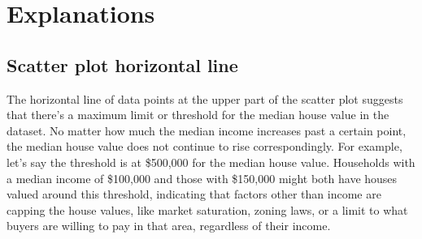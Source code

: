 \documentclass[12pt]{article}
\begin{document}
\section{Explanations}
\subsection{Scatter plot horizontal line}
The horizontal line of data points at the upper part of the scatter plot suggests that there's a maximum limit or threshold for the median house value in the dataset. No matter how much the median income increases past a certain point, the median house value does not continue to rise correspondingly.
For example, let’s say the threshold is at \$500,000 for the median house value. Households with a median income of \$100,000 and those with \$150,000 might both have houses valued around this threshold, indicating that factors other than income are capping the house values, like market saturation, zoning laws, or a limit to what buyers are willing to pay in that area, regardless of their income.
\end{document}
